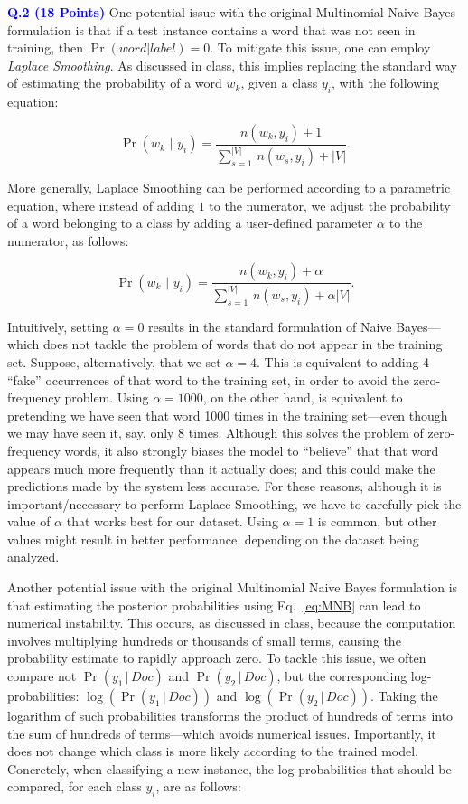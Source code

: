 \documentclass[letterpaper]{article}
\newcommand{\HIGHLIGHT}[1]{\textcolor{blue}{\textbf{#1}}}
\begin{document}
\noindent \HIGHLIGHT{Q.2 (18 Points)} One potential issue with the original Multinomial Naive Bayes formulation is that if a test instance contains a word that was not seen in training, then $\Pr(word|label)=0$. To mitigate this issue, one can employ \textit{Laplace Smoothing}. As discussed in class, this implies replacing the standard way of estimating the probability of a word $w_k$, given a class $y_i$, with the following equation:

\begin{equation}
    \Pr\left(w_k\,\,|\,\,y_i\right) = \frac{n(w_k, y_i) + 1}{\sum_{s=1}^{|V|} \, n(w_s, y_i) + |V|}.
\end{equation}

More generally, Laplace Smoothing can be performed according to a parametric equation, where instead of adding $1$ to the numerator, we adjust the probability of a word belonging to a class by adding a user-defined parameter $\alpha$ to the numerator, as follows:

\begin{equation}
    \Pr\left(w_k\,\,|\,\,y_i\right) = \frac{n(w_k, y_i) + \alpha}{\sum_{s=1}^{|V|} \, n(w_s, y_i) + \alpha |V|}.
\end{equation}

Intuitively, setting $\alpha = 0$ results in the standard formulation of Naive Bayes---which does not tackle the problem of words that do not appear in the training set. Suppose, alternatively, that we set $\alpha=4$. This is equivalent to adding 4 ``fake'' occurrences of that word to the training set, in order to avoid the zero-frequency problem. Using $\alpha=1000$, on the other hand, is equivalent to pretending we have seen that word 1000 times in the training set---even though we may have seen it, say, only 8 times. Although this solves the problem of zero-frequency words, it also strongly biases the model to ``believe'' that that word appears much more frequently than it actually does; and this could make the predictions made by the system less accurate. For these reasons, although it is important/necessary to perform Laplace Smoothing, we have to carefully pick the value of $\alpha$ that works best for our dataset. Using $\alpha=1$ is common, but other values might result in better performance, depending on the dataset being analyzed.


Another potential issue with the original Multinomial Naive Bayes formulation is that estimating the posterior probabilities using Eq.~\eqref{eq:MNB} can lead to numerical instability. This occurs, as discussed in class, because the computation involves multiplying hundreds or thousands of small terms, causing the probability estimate to rapidly approach zero. To tackle this issue, we often compare not $\Pr(y_1 \, | \, Doc)$ and $\Pr(y_2 \, | \, Doc)$, but the corresponding log-probabilities: $\log(\Pr(y_1 \, | \, Doc))$ and $\log(\Pr(y_2 \, | \, Doc))$. Taking the logarithm of such probabilities transforms the product of hundreds of terms into the sum of hundreds of terms---which avoids numerical issues. Importantly, it does not change which class is more likely according to the trained model. Concretely, when classifying a new instance, the log-probabilities that should be compared, for each class $y_i$, are as follows:
\end{document}
